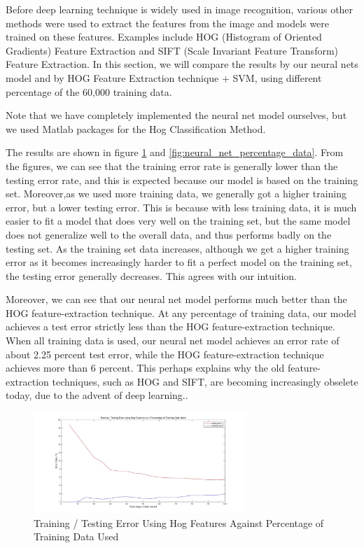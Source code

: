 \documentclass[10pt,twocolumn]{article}
\begin{document}
Before deep learning technique is widely used in image recognition, various other methods were used to extract the features from the image and models were trained on these features. Examples include HOG (Histogram of Oriented Gradients)  Feature Extraction and SIFT (Scale Invariant Feature Transform) Feature Extraction. In this section, we will compare the results by our neural nets model and by HOG Feature Extraction technique + SVM, using different percentage of the 60,000 training data.

Note that we have completely implemented the neural net model ourselves, but we used Matlab packages for the Hog Classification Method.

The results are shown in figure \ref{fig:hog} and \ref{fig:neural_net_percentage_data}. From the figures, we can see that the training error rate is generally lower than the testing error rate, and this is expected because our model is based on the training set. Moreover,as we used more training data, we generally got a higher training error, but a lower testing error. This is because with less training data, it is much easier to fit a model that does very well on the training set, but the same model does not generalize well to the overall data, and thus performs badly on the testing set. As the training set data increases, although we get a higher training error as it becomes increasingly harder to fit a perfect model on the training set, the testing error generally decreases. This agrees with our intuition.

Moreover, we can see that our neural net model performs much better than the HOG feature-extraction technique. At any percentage of training data, our model achieves a test error strictly less than the HOG feature-extraction technique. When all training data is used, our neural net model achieves an error rate of about 2.25 percent test error, while the HOG feature-extraction technique achieves more than 6 percent. This perhaps explains why the old feature-extraction techniques, such as HOG and SIFT, are becoming increasingly obselete today, due to the advent of deep learning..

\begin{figure}

\includegraphics[width = 8cm]{figure/hog}
\caption{Training / Testing Error Using Hog Features Against Percentage of Training Data Used}
\label{fig:hog}
\end{figure}
\end{document}
